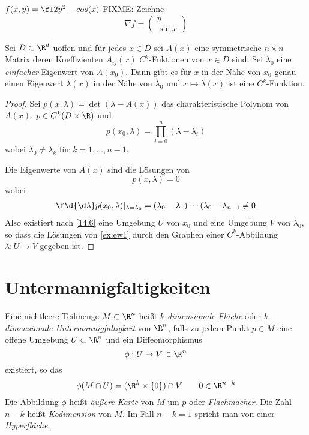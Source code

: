 \documentclass{mycourse}
\begin{document}
\begin{ex*}[Pendel!]
	$f(x,y) = \f 12y^2 -cos(x)$
	FIXME: Zeichne
	\[
		\nabla f = \begin{pmatrix}y\\ \sin x\end{pmatrix}
	\]
\end{ex*}

\begin{ex*}
	Sei $D\subset \R^d$ uoffen und für jedes $x\in D$ sei $A(x)$ eine symmetrische $n\times n$ Matrix deren Koeffizienten $A_{ij}(x)$ $C^k$-Fuktionen von $x\in D$ sind.
	Sei $\lambda_0$ eine \emph{einfacher} Eigenwert von $A(x_0)$.
	Dann gibt es für $x$ in der Nähe von $x_0$ genau einen Eigenwert $\lambda(x)$ in der Nähe von $\lambda_0$ und $x\mapsto \lambda(x)$ ist eine $C^k$-Funktion.
	\begin{proof}
		Sei $p(x,\lambda) = \det(\lambda-A(x))$ das charakteristische Polynom von $A(x)$.
		$p\in C^k(D\times \R)$ und
		\[
			p(x_0,\lambda) = \prod_{i=0}^n(\lambda-\lambda_i)
		\]
		wobei $\lambda_0\neq \lambda_k$ für $k=1,\dotsc,n-1$.

		Die Eigenwerte von $A(x)$ sind die Lösungen von
		\begin{equation}
			\label{ex:ew1}
			p(x,\lambda) = 0
		\end{equation}
		wobei
		\begin{align*}
			\f \d{\d\lambda}p(x_0,\lambda)|_{\lambda=\lambda_0} = (\lambda_0-\lambda_1)\dotsb (\lambda_0-\lambda_{n-1} \neq 0
		\end{align*}
		Also existiert nach \ref{14.6} eine Umgebung $U$ von $x_0$ und eine Umgebung $V$ von $\lambda_0$, so dass die Lösungen von \eqref{ex:ew1} durch den Graphen einer $C^k$-Abbildung $\lambda:U\to V$ gegeben ist.
	\end{proof}
\end{ex*}


\section{Untermannigfaltigkeiten}


Eine nichtleere Teilmenge $M\subset \R^n$ heißt \emph{$k$-dimensionale Fläche} oder \emph{$k$-dimensionale Untermannigfaltigkeit} von $\R^n$, falls zu jedem Punkt $p\in M$ eine offene Umgebung $U\subset \R^n$ und ein Diffeomorphismus
\[
	\phi:U\to V\subset \R^n
\]
existiert, so das
\[
	\phi(M\cap U) = (\R^k\times\{0\})\cap V \qquad 0\in \R^{n-k}
\]
Die Abbildung $\phi$ heißt \emph{äußere Karte} von $M$ um $p$ oder \emph{Flachmacher}.
Die Zahl $n-k$ heißt \emph{Kodimension} von $M$.
Im Fall $n-k=1$ spricht man von einer \emph{Hyperfläche}.
\end{document}
